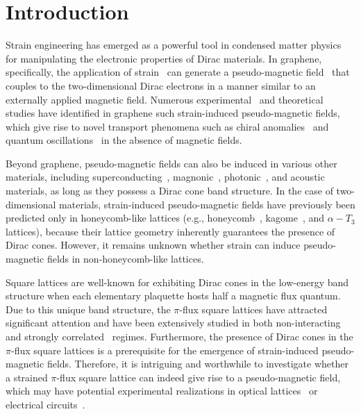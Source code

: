 \documentclass[aps, twocolumn, floatfix, superscriptaddress, prb]{revtex4-1}
\begin{document}
\section{Introduction}
Strain engineering has emerged as a powerful tool in condensed matter physics for manipulating the electronic properties of Dirac materials. In graphene, specifically, the application of strain~\cite{castroneto2009} can generate a pseudo-magnetic field~\cite{dejuan2013, vozmediano2010, guinea2010a, guinea2010b, neekamal2013, guinea2008, zhang2014, lantagne2020} that couples to the two-dimensional Dirac electrons in a manner similar to an externally applied magnetic field. Numerous experimental~\cite{levy2010, hsu2020, meng2013, lisy2015, lisy2020, nigge2019, jia2019} and theoretical~\cite{dejuan2012, chang2012, settnes2016, shi2021, liu2022} studies have identified in graphene such strain-induced pseudo-magnetic fields, which give rise to novel transport phenomena such as chiral anomalies~\cite{lantagne2020, shi2021} and quantum oscillations~\cite{liu2022} in the absence of magnetic fields.

Beyond graphene, pseudo-magnetic fields can also be induced in various other materials, including superconducting~\cite{liu2017b, matsushita2018, massarelli2017, nica2018}, magnonic~\cite{PhysRevLett.123.207204,liu2019, liu2021, liu2023, sun2021a, sun2021b}, photonic~\cite{rechtsman2013}, and acoustic~\cite{wen2019, brendel2017, peri2019} materials, as long as they possess a Dirac cone band structure. In the case of two-dimensional materials, strain-induced pseudo-magnetic fields have previously been predicted only in honeycomb-like lattices (e.g., honeycomb~\cite{poli2014, bao2023,PhysRevLett.117.266801,kohler2023nodal}, kagome~\cite{liu2020}, and $\alpha-T_3$\cite{sun2022, filusch2022} lattices), because their lattice geometry inherently guarantees the presence of Dirac cones. However, it remains unknown whether strain can induce pseudo-magnetic fields in non-honeycomb-like lattices.

Square lattices are well-known for exhibiting Dirac cones in the low-energy band structure when each elementary plaquette hosts half a magnetic flux quantum. Due to this unique band structure, the $\pi$-flux square lattices have attracted significant attention and have been extensively studied in both non-interacting~\cite{harris1989, delplace2010, hou2009} and strongly correlated~\cite{PhysRevB.88.075101,zhou2018, davis2019, zhang2020, shaffer2022} regimes. Furthermore, the presence of Dirac cones in the $\pi$-flux square lattices is a prerequisite for the emergence of strain-induced pseudo-magnetic fields. Therefore, it is intriguing and worthwhile to investigate whether a strained $\pi$-flux square lattice can indeed give rise to a pseudo-magnetic field, which may have potential experimental realizations in optical lattices~\cite{aidelsburger2013, miyake2013} or electrical circuits~\cite{lee2018}.
\end{document}
